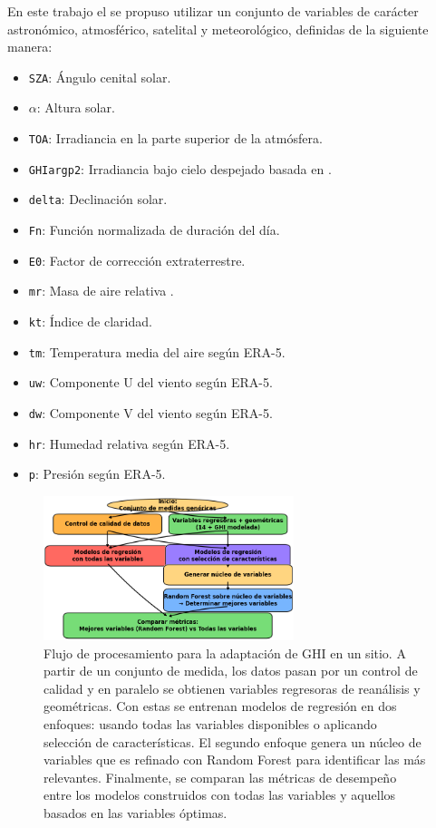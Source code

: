 En este trabajo el se propuso utilizar un conjunto de variables de carácter astronómico, atmosférico, satelital y meteorológico, definidas de la siguiente manera:

\begin{itemize}
\item \texttt{SZA}: Ángulo cenital solar.
\item \texttt{$\alpha$}: Altura solar.
\item \texttt{TOA}: Irradiancia en la parte superior de la atmósfera.
\item \texttt{GHIargp2}: Irradiancia bajo cielo despejado basada en \cite{Ledesma2023a}.
\item \texttt{delta}: Declinación solar.
\item \texttt{Fn}: Función normalizada de duración del día.
\item \texttt{E0}: Factor de corrección extraterrestre.
\item \texttt{mr}: Masa de aire relativa \cite{Gueymard2003}.
\item \texttt{kt}: Índice de claridad.
\item \texttt{tm}: Temperatura media del aire según ERA-5.
\item \texttt{uw}: Componente U del viento según ERA-5.
\item \texttt{dw}: Componente V del viento según ERA-5.
\item \texttt{hr}: Humedad relativa según ERA-5.
\item \texttt{p}: Presión según ERA-5.
\end{itemize}


\begin{figure}
    \centering
    \includegraphics[width=0.65\textwidth]{figuras/procedure_1.png}
    \caption{Flujo de procesamiento para la adaptación de GHI en un sitio. A partir de un conjunto de medida, los datos pasan por un control de calidad y en paralelo se obtienen variables regresoras de reanálisis y geométricas. Con estas se entrenan modelos de regresión en dos enfoques: usando todas las variables disponibles o aplicando selección de características. El segundo enfoque genera un núcleo de variables que es refinado con Random Forest para identificar las más relevantes. Finalmente, se comparan las métricas de desempeño entre los modelos construidos con todas las variables y aquellos basados en las variables óptimas.}
    \label{fig:procedureSA01}
\end{figure}



